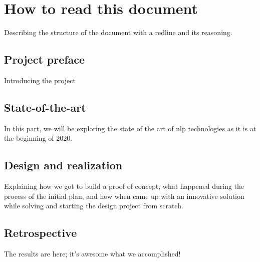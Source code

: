 \chapter{How to read this document}
\label{chap:how-to-read}
Describing the structure of the document with a redline and its reasoning. 


\section*{Project preface}
Introducing the project

\section*{State-of-the-art}
In this part, we will be exploring the state of the art of \gls{nlp} technologies as it is at the beginning of 2020. 

\section*{Design and realization}
Explaining how we got to build a proof of concept, what happened during the process of the initial plan, and how when came up with an innovative solution while solving and starting the design project from scratch.


\section*{Retrospective}
The results are here; it's awesome what we accomplished!